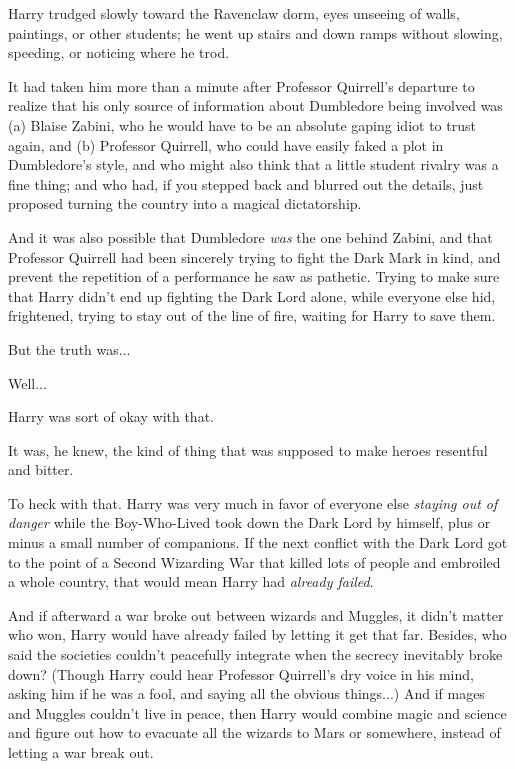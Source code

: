 Harry trudged slowly toward the Ravenclaw dorm, eyes unseeing of walls,
paintings, or other students; he went up stairs and down ramps without
slowing, speeding, or noticing where he trod.

It had taken him more than a minute after Professor Quirrell's departure
to realize that his only source of information about Dumbledore being
involved was (a) Blaise Zabini, who he would have to be an absolute
gaping idiot to trust again, and (b) Professor Quirrell, who could have
easily faked a plot in Dumbledore's style, and who might also think that
a little student rivalry was a fine thing; and who had, if you stepped
back and blurred out the details, just proposed turning the country into
a magical dictatorship.

And it was also possible that Dumbledore \emph{was} the one behind
Zabini, and that Professor Quirrell had been sincerely trying to fight
the Dark Mark in kind, and prevent the repetition of a performance he
saw as pathetic. Trying to make sure that Harry didn't end up fighting
the Dark Lord alone, while everyone else hid, frightened, trying to stay
out of the line of fire, waiting for Harry to save them.

But the truth was...

Well...

Harry was sort of okay with that.

It was, he knew, the kind of thing that was supposed to make heroes
resentful and bitter.

To heck with that. Harry was very much in favor of everyone else
\emph{staying out of danger} while the Boy-Who-Lived took down the Dark
Lord by himself, plus or minus a small number of companions. If the next
conflict with the Dark Lord got to the point of a Second Wizarding War
that killed lots of people and embroiled a whole country, that would
mean Harry had \emph{already failed}.

And if afterward a war broke out between wizards and Muggles, it didn't
matter who won, Harry would have already failed by letting it get that
far. Besides, who said the societies couldn't peacefully integrate when
the secrecy inevitably broke down? (Though Harry could hear Professor
Quirrell's dry voice in his mind, asking him if he was a fool, and
saying all the obvious things...) And if mages and Muggles couldn't
live in peace, then Harry would combine magic and science and figure out
how to evacuate all the wizards to Mars or somewhere, instead of letting
a war break out.

